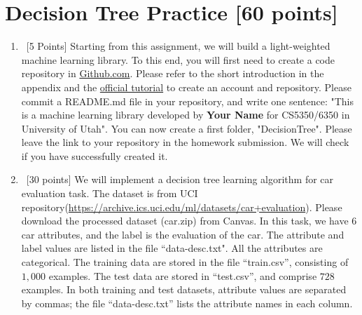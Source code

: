 \documentclass[12pt, fullpage,letterpaper]{article}
\begin{document}
\section{Decision Tree Practice [60 points]}
\begin{enumerate}
	\item~[5 Points] Starting from this assignment, we will build a light-weighted machine learning library. 
To this end, you will first need to create a code repository in \href{https://github.com/}{Github.com}. Please refer to the short introduction in the appendix and the \href{https://guides.github.com/activities/hello-world/}{official tutorial} to create an account and repository. Please commit a README.md file in your repository, and write one sentence: "This is a machine learning library developed by \textbf{Your Name} for CS5350/6350 in University of Utah".  You can now create a first folder, "DecisionTree". Please leave the link to your repository in the homework submission. We will check if you have successfully created it. 


\item~[30 points] We will implement a decision tree learning algorithm for car evaluation task. The dataset is from UCI repository(\url{https://archive.ics.uci.edu/ml/datasets/car+evaluation}). Please download the processed dataset (car.zip) from Canvas.  In this task, we have $6$ car attributes, and the label is the evaluation of the car. The attribute and label values are listed in the file ``data-desc.txt". All the attributes are categorical.  The training data are stored in the file ``train.csv'', consisting of $1,000$ examples. The test data are stored in ``test.csv'', and comprise $728$ examples. In both training and test datasets, attribute values are separated by commas; the file ``data-desc.txt''  lists the attribute names in each column. 
\\


\end{enumerate}
\end{document}
